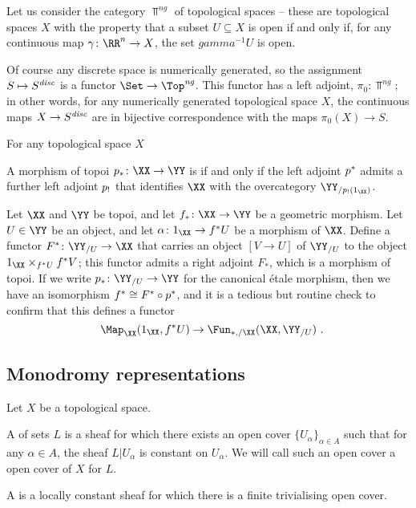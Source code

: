 \begin{nul}
	Let us consider the category $ \Top^{\textit{ng}} $ of  topological spaces -- these are topological spaces $ X $ with the property that a subset $ U \subseteq X $ is open if and only if, for any continuous map $ \gamma \colon \RR^n \to X $, the set $ gamma^{-1} U $ is open.
	
	Of course any discrete space is numerically generated, so the assignment $ S \mapsto S^{\textit{disc}} $ is a functor $ \Set \to \Top^{\textit{ng}} $.
	This functor has a left adjoint, $ \pi_0 \colon \Top^{\textit{ng}} $;
	in other words, for any numerically generated topological space $ X $, the continuous maps $ X \to S^{\textit{disc}} $ are in bijective correspondence with the maps $ \pi_0(X) \to S $.
\end{nul}

For any  topological space $ X $ 

\begin{dfn}
	A morphism of topoi $ \plowerstar \colon \XX \to \YY $ is  if and only if the left adjoint $ p^{\ast} $ admits a further left adjoint $ p_{!} $ that identifies $ \XX $ with the overcategory $ \YY_{/\plowershriek(1_{\XX})} $.
\end{dfn}

\begin{cnstr}
	Let $ \XX $ and $ \YY $ be topoi, and let $ f_{\ast} \colon \XX \to \YY $ be a geometric morphism.
	Let $ U \in \YY $ be an object, and let $ \alpha \colon 1_{\XX} \to f^{\ast} U $ be a morphism of $ \XX $.
	Define a functor $ F^{\ast} \colon \YY_{/U} \to \XX $ that carries an object $ [ V \to U ] $ of $ \YY_{/U} $ to the object $ 1_{\XX} \times_{f^{\ast} U} f^{\ast} V $;
	this functor admits a right adjoint $ F_{\ast} $, which is a morphism of topoi.
	If we write $ \plowerstar \colon \YY_{/U} \to \YY $ for the canonical étale morphism, then we have an isomorphism $ f^{\ast} \cong F^{\ast} \circ p^{\ast} $, and
	it is a tedious but routine check to confirm that this defines a functor
	\[
		\Map_{\XX}(1_{\XX}, \fupperstar U) \to \Fun_{\ast,/\XX}(\XX, \YY_{/U}) \period
	\]
\end{cnstr}

\subsection*{Monodromy representations}
\begin{dfn}
	Let $ X $ be a topological space.

	A   of sets $ L $ is a sheaf for which there exists an open cover $ \{ U_{\alpha} \}_{\alpha \in A} $ such that for any $ \alpha \in A $, the sheaf $ L | U_{\alpha} $ is constant on $ U_{\alpha} $.
	We will call such an open cover a  open cover of $ X $ for $ L $.

	A  is a locally constant sheaf for which there is a finite trivialising open cover.
\end{dfn}

